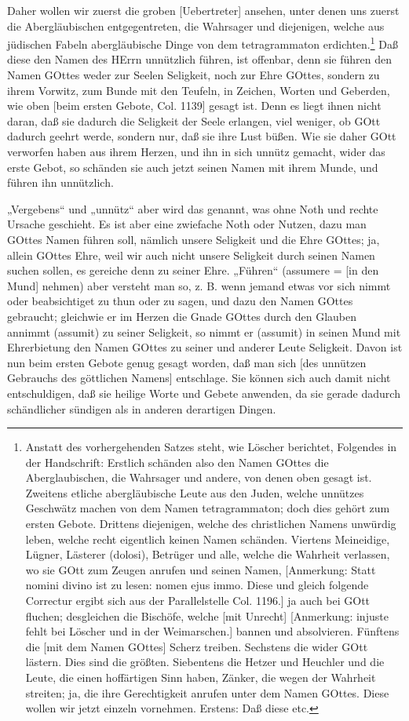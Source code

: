 Daher wollen wir zuerst die groben [Uebertreter] ansehen, unter denen uns zuerst die Abergläubischen entgegentreten, die Wahrsager und diejenigen, welche aus jüdischen Fabeln abergläubische Dinge von dem tetragrammaton erdichten.\footnote{Anstatt des vorhergehenden Satzes steht, wie Löscher berichtet, Folgendes in der Handschrift: Erstlich schänden also den Namen GOttes die Aberglaubischen, die Wahrsager und andere, von denen oben gesagt ist. Zweitens etliche abergläubische Leute aus den Juden, welche unnützes Geschwätz machen von dem Namen tetragrammaton; doch dies gehört zum ersten Gebote. Drittens diejenigen, welche des christlichen Namens unwürdig leben, welche recht eigentlich keinen Namen schänden. Viertens Meineidige, Lügner, Lästerer (dolosi), Betrüger und alle, welche die Wahrheit verlassen, wo sie GOtt zum Zeugen anrufen und seinen Namen, [Anmerkung: Statt nomini divino ist zu lesen: nomen ejus immo. Diese und gleich folgende Correctur ergibt sich aus der Parallelstelle Col. 1196.] ja auch bei GOtt fluchen; desgleichen die Bischöfe, welche [mit Unrecht] [Anmerkung: injuste fehlt bei Löscher und in der Weimarschen.] bannen und absolvieren. Fünftens die [mit dem Namen GOttes] Scherz treiben. Sechstens die wider GOtt lästern. Dies sind die größten. Siebentens die Hetzer und Heuchler und die Leute, die einen hoffärtigen Sinn haben, Zänker, die wegen der Wahrheit streiten; ja, die ihre Gerechtigkeit anrufen unter dem Namen GOttes. Diese wollen wir jetzt einzeln vornehmen. Erstens: Daß diese etc.} Daß diese den Namen des HErrn unnützlich führen, ist offenbar, denn sie führen den Namen GOttes weder zur Seelen Seligkeit, noch zur Ehre GOttes, sondern zu ihrem Vorwitz, zum Bunde mit den Teufeln, in Zeichen, Worten und Geberden, wie oben [beim ersten Gebote, Col. 1139] gesagt ist. Denn es liegt
ihnen nicht daran, daß sie dadurch die Seligkeit der Seele erlangen, viel weniger, ob GOtt dadurch geehrt werde, sondern nur, daß sie ihre Lust büßen. Wie sie daher GOtt verworfen haben aus ihrem Herzen, und ihn in sich unnütz gemacht, wider das erste Gebot, so schänden sie auch jetzt seinen Namen mit ihrem Munde, und führen ihn unnützlich.

„Vergebens“ und „unnütz“ aber wird das genannt, was ohne Noth und rechte Ursache geschieht. Es ist aber eine zwiefache Noth oder Nutzen, dazu man GOttes Namen führen soll, nämlich unsere Seligkeit und die Ehre GOttes; ja, allein GOttes Ehre, weil wir auch nicht unsere Seligkeit durch seinen Namen suchen sollen, es gereiche denn zu seiner Ehre. „Führen“ (assumere = [in den Mund] nehmen) aber versteht man so, z. B. wenn jemand etwas vor sich nimmt oder beabsichtiget zu thun oder zu sagen, und dazu den Namen GOttes gebraucht; gleichwie er im Herzen die Gnade GOttes durch den Glauben annimmt (assumit) zu seiner Seligkeit, so nimmt er (assumit) in seinen Mund mit Ehrerbietung den Namen GOttes zu seiner und anderer Leute Seligkeit. Davon ist nun beim ersten Gebote genug gesagt worden, daß man sich [des unnützen Gebrauchs des göttlichen Namens] entschlage. Sie können sich auch damit nicht entschuldigen, daß sie heilige Worte und Gebete anwenden, da sie gerade dadurch schändlicher sündigen als in anderen derartigen Dingen.

